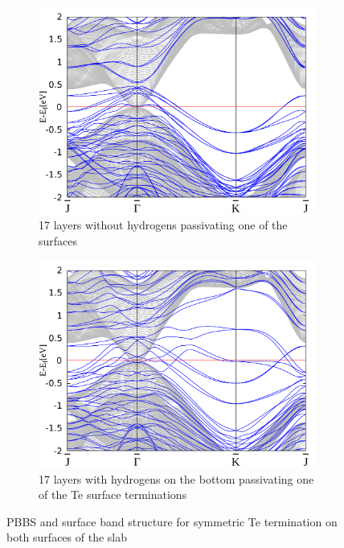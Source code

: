 \begin{figure}[htbp]
\begin{subfigure}[c]{.48\linewidth}
			\includegraphics[width=\linewidth]{Te_termination/no_H_bulk+17_layers_no_dos_-2_2.pdf}
			\caption{17 layers without hydrogens passivating one of the surfaces} 
		\end{subfigure}
		\hfill
		\begin{subfigure}[c]{.48\linewidth}
			\centering
			\includegraphics[width=\linewidth]{Te_termination/bulk+17_layers_no_dos_-2_2.pdf}
			\caption{17 layers with hydrogens on the bottom passivating one of the Te surface terminations}
		\end{subfigure}
		\caption{PBBS and surface band structure for symmetric Te termination on both surfaces of the slab} 
		\label{bulk+surface_odd_layers_Te}
	\end{figure}

